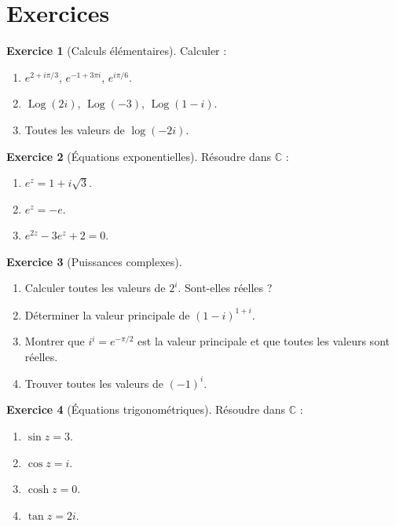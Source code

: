 \documentclass[12pt,a4paper,openany]{book}
\theoremstyle{definition}
\newtheorem{exercice}{Exercice}[chapter]
\theoremstyle{plain}
\theoremstyle{remark}
\newcommand{\C}{\mathbb{C}}
\DeclareMathOperator{\Log}{Log}
\begin{document}
\section{Exercices}\label{sec:exercices-ch3}

\begin{exercice}[Calculs élémentaires]\label{exo:calculs-exp-log}
Calculer :
\begin{enumerate}[label=(\alph*)]
  \item $e^{2+i\pi/3}$, $e^{-1+3\pi i}$, $e^{i\pi/6}$.
  \item $\Log(2i)$, $\Log(-3)$, $\Log(1-i)$.
  \item Toutes les valeurs de $\log(-2i)$.
\end{enumerate}
\end{exercice}

\begin{exercice}[Équations exponentielles]\label{exo:equations-exp}
Résoudre dans $\C$ :
\begin{enumerate}[label=(\alph*)]
  \item $e^z = 1 + i\sqrt{3}$.
  \item $e^z = -e$.
  \item $e^{2z} - 3e^z + 2 = 0$.
\end{enumerate}
\end{exercice}

\begin{exercice}[Puissances complexes]\label{exo:puissances}
\begin{enumerate}[label=(\alph*)]
  \item Calculer toutes les valeurs de $2^i$. Sont-elles réelles ?
  \item Déterminer la valeur principale de $(1-i)^{1+i}$.
  \item Montrer que $i^i = e^{-\pi/2}$ est la valeur principale et que toutes les valeurs sont réelles.
  \item Trouver toutes les valeurs de $(-1)^i$.
\end{enumerate}
\end{exercice}

\begin{exercice}[Équations trigonométriques]\label{exo:equations-trig}
Résoudre dans $\C$ :
\begin{enumerate}[label=(\alph*)]
  \item $\sin z = 3$.
  \item $\cos z = i$.
  \item $\cosh z = 0$.
  \item $\tan z = 2i$.
\end{enumerate}
\end{exercice}
\end{document}
